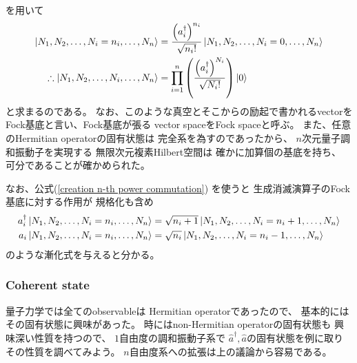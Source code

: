 を用いて
\begin{align}
    \ket{N_1, N_2,\dots,N_i=n_i,\dots, N_n}
    &=
    \dfrac{
        \left(
            a_i^\dagger
        \right)^{n_i}
    }{\sqrt{n_i!}}
    \ket{N_1, N_2,\dots,
    N_i = 0,
    \dots, N_n}
\notag\\\therefore
    \ket{N_1, N_2,\dots,N_i,\dots, N_n}
    &=
    \prod_{i=1}^n
    \left(
        \dfrac{
            \left(
                a_i^\dagger
            \right)^{N_i}
        }{\sqrt{N_i!}}
    \right)
    \ket{0}
\label{fock basis of harmonic oscillator}
\end{align}
と求まるのである。
なお、このような真空とそこからの励起で書かれるvectorを
Fock基底と言い、Fock基底が張る
vector spaceをFock spaceと呼ぶ。
また、任意のHermitian operatorの固有状態は
完全系を為すのであったから、
$n$次元量子調和振動子を実現する
無限次元複素Hilbert空間は
確かに加算個の基底を持ち、
可分であることが確かめられた。

なお、公式(\ref{creation n-th power commutation})
を使うと
生成消滅演算子のFock基底に対する作用が
規格化も含め
\begin{subequations}
\begin{align}
    a_i^\dagger
    \ket{N_1, N_2,\dots,N_i=n_i,\dots, N_n}
    &=
    \sqrt{n_i+1}
    \ket{N_1, N_2,\dots,N_i=n_i+1,\dots, N_n}
\\
    a_i
    \ket{N_1, N_2,\dots,N_i=n_i,\dots, N_n}
    &=
    \sqrt{n_i}
    \ket{N_1, N_2,\dots,N_i=n_i-1,\dots, N_n}
\end{align}
\label{Fock basis recurrence relation}
\end{subequations}
のような漸化式を与えると分かる。

\subsubsection{Coherent state}

量子力学では全てのobservableは
Hermitian operatorであったので、
基本的にはその固有状態に興味があった。
時にはnon-Hermitian operatorの固有状態も
興味深い性質を持つので、
$1$自由度の調和振動子系で
$\hat{a}^\dagger, \hat{a}$の固有状態を例に取り
その性質を調べてみよう。
$n$自由度系への拡張は上の議論から容易である。

